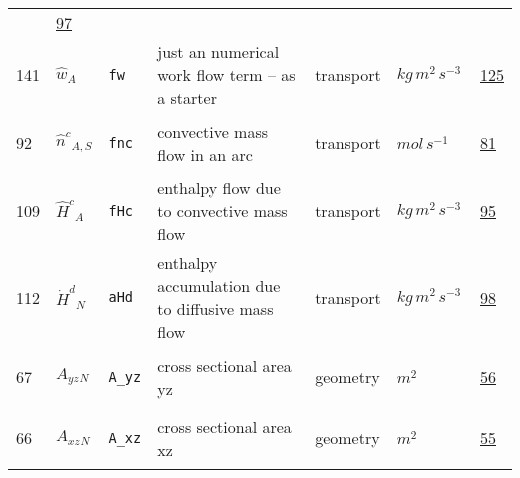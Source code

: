 \begin{longtable}{|p{1cm}|p{2.5cm}|p{4.5cm}|p{8cm}|p{3.0cm}|p{3cm}|p{1cm}|}
             &                 \hyperlink{"e:97"}{ 97 }
                 \\
            141
             & \hypertarget{"v:141"}{ $ {{\hat{w}}}{_{A}} $}
             & \verb|fw|
             & just an numerical work flow term -- as a starter
             & \begin{lay}transport \end{lay}
             & $ kg \,m^{2} \,s^{-3} \, $
             &                 \hyperlink{"e:125"}{ 125 }
                 \\
            92
             & \hypertarget{"v:92"}{ $ {{\hat{n}^c}}{_{A, S}} $}
             & \verb|fnc|
             & convective mass flow in an arc
             & \begin{lay}transport \end{lay}
             & $ mol \,s^{-1} \, $
             &                 \hyperlink{"e:81"}{ 81 }
                 \\
            109
             & \hypertarget{"v:109"}{ $ {{\hat{H}^c}}{_{A}} $}
             & \verb|fHc|
             & enthalpy flow due to convective mass flow
             & \begin{lay}transport \end{lay}
             & $ kg \,m^{2} \,s^{-3} \, $
             &                 \hyperlink{"e:95"}{ 95 }
                 \\
            112
             & \hypertarget{"v:112"}{ $ {{\dot{H}^d}}{_{N}} $}
             & \verb|aHd|
             & enthalpy accumulation due to diffusive mass flow
             & \begin{lay}transport \end{lay}
             & $ kg \,m^{2} \,s^{-3} \, $
             &                 \hyperlink{"e:98"}{ 98 }
                 \\
            67
             & \hypertarget{"v:67"}{ $ {{A_{yz}}}{_{N}} $}
             & \verb|A_yz|
             & cross sectional area yz
             & \begin{lay}geometry \end{lay}
             & $ m^{2} \, $
             &                 \hyperlink{"e:56"}{ 56 }
                 \\
            66
             & \hypertarget{"v:66"}{ $ {{A_{xz}}}{_{N}} $}
             & \verb|A_xz|
             & cross sectional area xz
             & \begin{lay}geometry \end{lay}
             & $ m^{2} \, $
             &                 \hyperlink{"e:55"}{ 55 }

\end{longtable}
